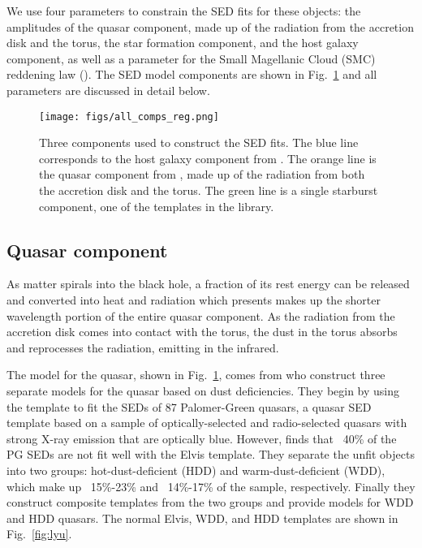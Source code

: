 We use four parameters to constrain the SED fits for these objects: the amplitudes of the quasar component, made up of the radiation from 
the accretion disk and the torus, the star formation component, and the host galaxy component, as well as a parameter for the 
Small Magellanic Cloud (SMC) reddening law (\citealp{prevot1984}). The SED model components are shown in Fig.~\ref{fig:comps} 
and all parameters are discussed in detail below. 

\begin{figure}[t]
  \centering
  \texttt{[image: figs/all\_comps\_reg.png]}
  \caption{Three components used to construct the SED fits. The blue line corresponds to  
           the host galaxy component from \cite{fioc1997}. The orange line is the quasar component from 
           \cite{lyu2017feb}, made up of the radiation from both the accretion disk and the torus. 
           The green line is a single starburst component, one of the templates in the 
           \cite{dalehelou2002} library.}
           \label{fig:comps}
\end{figure}

\subsection{Quasar component}
\label{sec:bbb}
As matter spirals into the black hole, a fraction of its rest energy can be released and converted into heat and radiation which 
presents makes up the shorter wavelength portion of the entire quasar component. As the radiation from the accretion disk comes 
into contact with the torus, the dust in the torus absorbs and reprocesses the radiation, emitting in the infrared.

The model for the quasar, shown in Fig.~\ref{fig:comps}, comes from \cite{lyu2017feb} who construct three separate models for the quasar based on 
dust deficiencies. They begin by using the \cite{elvis1994} template to fit the SEDs of 87 Palomer-Green quasars, a quasar 
SED template based on a sample of optically-selected and radio-selected quasars with strong X-ray emission that are optically blue.
However, \cite{lyu2017feb} finds that ~40\% of the PG SEDs are not fit well with the Elvis template. 
They separate the unfit objects into two groups: 
hot-dust-deficient (HDD) and warm-dust-deficient (WDD), which make up ~15\%-23\% and ~14\%-17\% of the sample, respectively. 
Finally they construct composite templates from the two 
groups and provide models for WDD and HDD quasars. The normal Elvis, WDD, and HDD templates are shown in Fig.~\ref{fig:lyu}.
  
